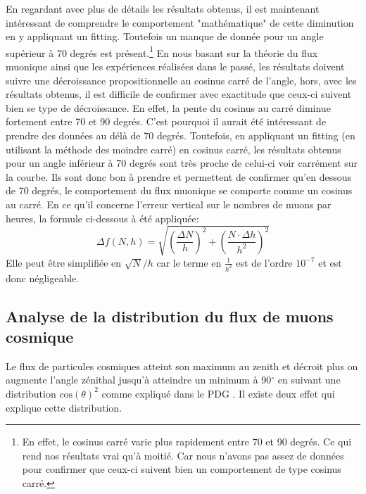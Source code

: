 \documentclass[12pt]{article}
\begin{document}
 En regardant avec plus de détails les résultats obtenus, il est maintenant intéressant de comprendre le comportement "mathématique" de cette diminution en y appliquant un fitting. Toutefois un manque de donnée pour un angle supérieur à 70 degrés est présent.\footnote{En effet, le cosinus carré varie plus rapidement entre 70 et 90 degrés. Ce qui rend nos résultats vrai qu'à moitié. Car nous n'avons pas assez de données pour confirmer que ceux-ci suivent bien un comportement de type cosinus carré.} En nous basant sur la théorie du flux muonique ainsi que les expériences réalisées dans le passé, les résultats doivent suivre une décroissance propositionnelle au cosinus carré de l'angle, hors, avec les résultats obtenus, il est difficile de confirmer avec exactitude que ceux-ci suivent bien se type de décroissance. En effet, la pente du cosinus au carré diminue fortement entre 70 et 90 degrés. C'est pourquoi il aurait été intéressant de prendre des données au délà de 70 degrés. Toutefois, en appliquant un fitting (en utilisant la méthode des moindre carré) en cosinus carré, les résultats obtenus pour un angle inférieur à 70 degrés sont très proche de celui-ci voir carrément sur la courbe. Ils sont donc bon à prendre et permettent de confirmer qu'en dessous de 70 degrés, le comportement du flux muonique se comporte comme un cosinus au carré.
 En ce qu'il concerne l'erreur vertical sur le nombres de muons par heures, la formule ci-dessous à été appliquée:
\[
    \Delta f(N,h)=\sqrt{\left(\frac{\Delta N}{h}\right)^2+\left(\frac{N\cdot\Delta h }{h^2}\right)^2}
\]
Elle peut être simplifiée en $\sqrt{N}/h$ car le terme en $\frac{1}{h^2}$ est de l'ordre $10^{-7}$ et est donc négligeable.

\subsection{Analyse de la distribution du flux de muons cosmique}

Le flux de particules cosmiques atteint son maximum au zenith et décroit plus on augmente l'angle zénithal jusqu'à atteindre un minimum à 90$^\circ$ en suivant une distribution $\text{cos}(\theta)^2$ comme expliqué dans le PDG \cite{PhysRevD.98.030001}. Il existe deux effet qui explique cette distribution.
\end{document}
